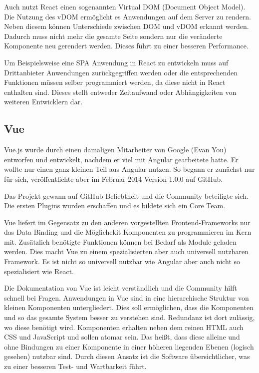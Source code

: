 Auch nutzt React einen sogenannten Virtual DOM (Document Object Model). Die Nutzung des vDOM ermöglicht es Anwendungen auf dem Server zu rendern. Neben diesem können Unterschiede zwischen DOM und vDOM erkannt werden. Dadurch muss nicht mehr die gesamte Seite sondern nur die veränderte Komponente neu gerendert werden. Dieses führt zu einer besseren Performance. \cite{bezJavaScriptEinfuehrungReact2015}

Um Beispielsweise eine SPA Anwendung in React zu entwickeln muss auf Drittanbieter Anwendungen zurückgegriffen werden oder die entsprechenden Funktionen müssen selber programmiert werden, da diese nicht in React enthalten sind. Dieses stellt entweder Zeitaufwand oder Abhängigkeiten von weiteren Entwicklern dar.

\subsection{Vue}
Vue.js wurde durch einen damaligen Mitarbeiter von Google (Evan You) entworfen und entwickelt, nachdem er viel mit Angular gearbeitete hatte. Er wollte nur einen ganz kleinen Teil aus Angular nutzen. So begann er zunächst nur für sich, veröffentlichte aber im Februar 2014 Version 1.0.0 auf GitHub.

Das Projekt gewann auf GitHub Beliebtheit und die Community beteiligte sich. Die ersten Plugins wurden erschaffen und es bildete sich ein Core Team.

Vue liefert im Gegensatz zu den anderen vorgestellten Frontend-Frameworks nur das Data Binding und die Möglichekit Komponenten zu programmieren im Kern mit. Zusätzlich benötigte Funktionen können bei Bedarf als Module geladen werden. Dies macht Vue zu einem spezialisierten aber auch universell nutzbaren Framework. Es ist nicht so universell nutzbar wie Angular aber auch nicht so spezialisiert wie React. \cite{teufelVueJsTutorial2018}

Die Dokumentation von Vue ist leicht verständlich und die Community hilft schnell bei Fragen. 
Anwendungen in Vue sind in eine hierarchische Struktur von kleinen Komponenten untergliedert. Dies soll ermöglichen, dass die Komponenten und so das gesamte System besser zu verstehen sind. Redundanz ist dort zulässig, wo diese benötigt wird.
Komponenten erhalten neben dem reinen HTML auch CSS und JavaScript und sollen atomar sein. Das heißt, dass diese alleine und ohne Bindungen zu einer Komponente in einer höheren liegenden Ebenen (logisch gesehen) nutzbar sind. Durch diesen Ansatz ist die Software übersichtlicher, was zu einer besseren Test- und Wartbarkeit führt.

